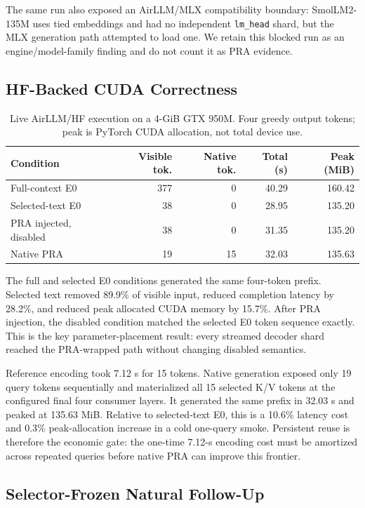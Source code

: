 \documentclass[10pt]{article}
\begin{document}
The same run also exposed an AirLLM/MLX compatibility boundary: SmolLM2-135M
uses tied embeddings and had no independent \texttt{lm\_head} shard, but the
MLX generation path attempted to load one. We retain this blocked run as an
engine/model-family finding and do not count it as PRA evidence.

\subsection{HF-Backed CUDA Correctness}

\begin{table}[t]
\centering
\caption{Live AirLLM/HF execution on a 4-GiB GTX 950M. Four greedy output
tokens; peak is PyTorch CUDA allocation, not total device use.}
\label{tab:cuda}
\small
\begin{tabular}{lrrrr}
\toprule
Condition & Visible tok. & Native tok. & Total (s) & Peak (MiB) \\
\midrule
Full-context E0 & 377 & 0 & 40.29 & 160.42 \\
Selected-text E0 & 38 & 0 & 28.95 & 135.20 \\
PRA injected, disabled & 38 & 0 & 31.35 & 135.20 \\
Native PRA & 19 & 15 & 32.03 & 135.63 \\
\bottomrule
\end{tabular}
\end{table}

The full and selected E0 conditions generated the same four-token prefix.
Selected text removed 89.9\% of visible input, reduced completion latency by
28.2\%, and reduced peak allocated CUDA memory by 15.7\%. After PRA injection,
the disabled condition matched the selected E0 token sequence exactly. This is
the key parameter-placement result: every streamed decoder shard reached the
PRA-wrapped path without changing disabled semantics.

Reference encoding took 7.12 s for 15 tokens. Native generation exposed only
19 query tokens sequentially and materialized all 15 selected K/V tokens at the
configured final four consumer layers. It generated the same prefix in 32.03 s
and peaked at 135.63 MiB. Relative to selected-text E0, this is a 10.6\% latency
cost and 0.3\% peak-allocation increase in a cold one-query smoke. Persistent
reuse is therefore the economic gate: the one-time 7.12-s encoding cost must be
amortized across repeated queries before native PRA can improve this frontier.

\subsection{Selector-Frozen Natural Follow-Up}
\end{document}
